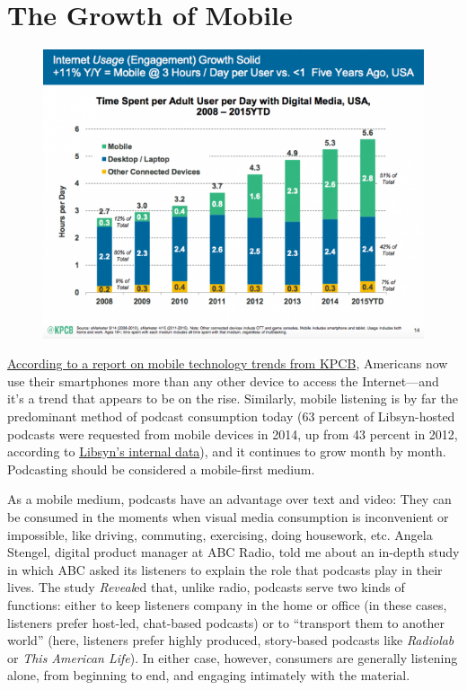 \documentclass[notoc, symmetric, nobib, nols]{towcenter-guideto-book}
\begin{document}
\section{The Growth of Mobile}

\begin{figure}
\begin{centering}
\includegraphics[width=.9\textwidth]{graphics/PODCAST15_KPCB_Mobile.png}
\caption{}
\end{centering}
\end{figure}

\href{http://www.smartinsights.com/internet-marketing-statistics/insights-from-kpcb-us-and-global-internet-trends-2015-report/}{According to a report on mobile technology trends from KPCB}, Americans now use their smartphones more than any other device to access the Internet---and it's a trend that appears to be on the rise.\autocite{KPCB} Similarly, mobile listening is by far the predominant method of podcast consumption today (63 percent of Libsyn-hosted podcasts were requested from mobile devices in 2014, up from 43 percent in 2012, according to \href{http://www.libsyn.com/wp-content/uploads/2015/06/PRLibsynNetGrowth021915Final.pdf}{Libsyn's internal data}), and it continues to grow month by month.\autocite{libsyndata} Podcasting should be considered a mobile-first medium.


As a mobile medium, podcasts have an advantage over text and video: They can be consumed in the moments when visual media consumption is inconvenient or impossible, like driving, commuting, exercising, doing housework, etc. Angela Stengel, digital product manager at ABC Radio, told me about an in-depth study in which ABC asked its listeners to explain the role that podcasts play in their lives. The study \textit{Reveal}ed that, unlike radio, podcasts serve two kinds of functions: either to keep listeners company in the home or office (in these cases, listeners prefer host-led, chat-based podcasts) or to ``transport them to another world'' (here, listeners prefer highly produced, story-based podcasts like \textit{Radiolab} or \textit{This American Life}). In either case, however, consumers are generally listening alone, from beginning to end, and engaging intimately with the material.\autocite{Stengel} 
\end{document}

